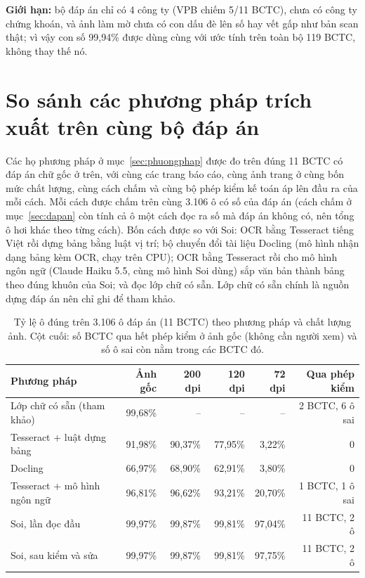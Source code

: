 \documentclass[12pt,a4paper]{report}
\begin{document}
\textbf{Giới hạn:} bộ đáp án chỉ có 4 công ty (VPB chiếm 5/11 BCTC), chưa có công ty chứng khoán, và ảnh làm mờ chưa có
con dấu đè lên số hay vết gấp như bản scan thật; vì vậy con số 99,94\% được dùng cùng với ước tính trên toàn bộ 119
BCTC, không thay thế nó.

\section{So sánh các phương pháp trích xuất trên cùng bộ đáp án}\label{sec:sosanhpp}
Các họ phương pháp ở mục~\ref{sec:phuongphap} được đo trên đúng 11 BCTC có đáp án chữ gốc ở trên, với cùng các trang báo
cáo, cùng ảnh trang ở cùng bốn mức chất lượng, cùng cách chấm và cùng bộ phép kiểm kế toán áp lên đầu ra của mỗi cách.
Mỗi cách được chấm trên cùng 3.106 ô có số của đáp án (cách chấm ở mục~\ref{sec:dapan} còn tính cả ô một cách đọc ra số
mà đáp án không có, nên tổng ô hơi khác theo từng cách). Bốn cách được so với Soi: OCR bằng Tesseract tiếng Việt rồi
dựng bảng bằng luật vị trí; bộ chuyển đổi tài liệu Docling (mô hình nhận dạng bảng kèm OCR, chạy trên CPU); OCR bằng
Tesseract rồi cho mô hình ngôn ngữ (Claude Haiku 5.5, cùng mô hình Soi dùng) sắp văn bản thành bảng theo đúng khuôn của
Soi; và đọc lớp chữ có sẵn. Lớp chữ có sẵn chính là nguồn dựng đáp án nên chỉ ghi để tham khảo.

\begin{table}[H]
\centering\small
\caption{Tỷ lệ ô đúng trên 3.106 ô đáp án (11 BCTC) theo phương pháp và chất lượng ảnh. Cột cuối: số BCTC qua hết
phép kiểm ở ảnh gốc (không cần người xem) và số ô sai còn nằm trong các BCTC đó.}\label{tab:sosanhpp}
\begin{tabularx}{\linewidth}{@{}>{\raggedright\arraybackslash}Xrrrrr@{}}
\toprule
\textbf{Phương pháp} & \textbf{Ảnh gốc} & \textbf{200 dpi} & \textbf{120 dpi} & \textbf{72 dpi} & \textbf{Qua phép kiểm} \\ \midrule
Lớp chữ có sẵn (tham khảo) & 99,68\% & -- & -- & -- & 2 BCTC, 6 ô sai \\
Tesseract + luật dựng bảng & 91,98\% & 90,37\% & 77,95\% & 3,22\% & 0 \\
Docling & 66,97\% & 68,90\% & 62,91\% & 3,80\% & 0 \\
Tesseract + mô hình ngôn ngữ & 96,81\% & 96,62\% & 93,21\% & 20,70\% & 1 BCTC, 1 ô sai \\
Soi, lần đọc đầu & 99,97\% & 99,87\% & 99,81\% & 97,04\% & 11 BCTC, 2 ô \\
Soi, sau kiểm và sửa & 99,97\% & 99,87\% & 99,81\% & 97,75\% & 11 BCTC, 2 ô \\
\bottomrule
\end{tabularx}
\end{table}
\end{document}
